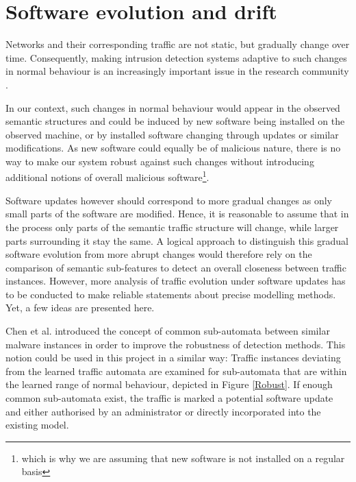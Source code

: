 \documentclass[a4paper,12pt,twoside]{report}
\begin{document}
\section{Software evolution and drift}\label{Robustness}

Networks and their corresponding traffic are not static, but gradually change over time. Consequently, making intrusion detection systems adaptive to such changes in normal behaviour is an increasingly important issue in the research community \cite{sommer_outside_2010,noble_real-time_2018}.

In our context, such changes in normal behaviour would appear in the observed semantic structures and could be induced by new software being installed on the observed machine, or by installed software changing through updates or similar modifications. As new software could equally be of malicious nature, there is no way to make our system robust against such changes without introducing additional notions of overall malicious software\footnote{which is why we are assuming that new software is not installed on a regular basis}. 

Software updates however should correspond to more gradual changes as only small parts of the software are modified. Hence, it is reasonable to assume that in the process only parts of the semantic traffic structure will change, while larger parts surrounding it stay the same. %
A logical approach to distinguish this gradual software evolution from more abrupt changes would therefore rely on the comparison of semantic sub-features to detect an overall closeness between traffic instances. However, more analysis of traffic evolution under software updates has to be conducted to make reliable statements about precise modelling methods. Yet, a few ideas are presented here.

Chen et al. \cite{chen_more_2016, chen_2016_robust} introduced the concept of common sub-automata between similar malware instances in order to improve the robustness of detection methods. This notion could be used in this project in a similar way: Traffic instances deviating from the learned traffic automata are examined for sub-automata that are within the learned range of normal behaviour, depicted in Figure \ref{Robust}. If enough common sub-automata exist, the traffic is marked a potential software update and either authorised by an administrator or directly incorporated into the existing model. 
\end{document}
